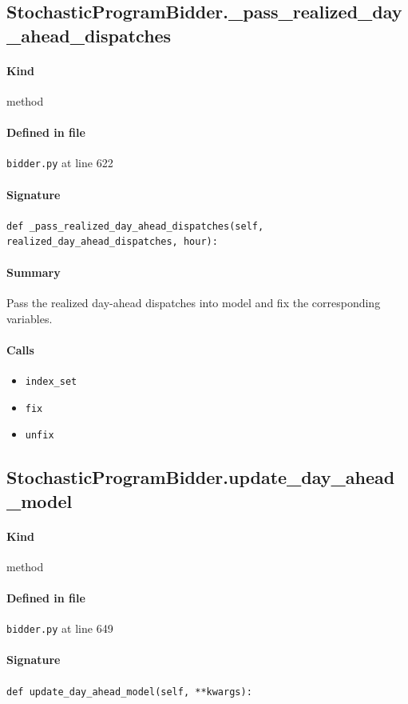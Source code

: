 \documentclass[11pt]{report}
\begin{document}
\subsection{StochasticProgramBidder.\_pass\_realized\_day\_ahead\_dispatches}
\label{def:bidder.py:StochasticProgramBidder._pass_realized_day_ahead_dispatches:L622}
\paragraph{Kind} method
\paragraph{Defined in file} \texttt{bidder.py} at line 622
\paragraph{Signature} \texttt{def \_pass\_realized\_day\_ahead\_dispatches(self, realized\_day\_ahead\_dispatches, hour):}
\paragraph{Summary} Pass the realized day-ahead dispatches into model and fix the corresponding variables.
\paragraph{Calls}
\begin{itemize}[leftmargin=*]
  \item \texttt{index\_set}
  \item \texttt{fix}
  \item \texttt{unfix}
\end{itemize}
\subsection{StochasticProgramBidder.update\_day\_ahead\_model}
\label{def:bidder.py:StochasticProgramBidder.update_day_ahead_model:L649}
\paragraph{Kind} method
\paragraph{Defined in file} \texttt{bidder.py} at line 649
\paragraph{Signature} \texttt{def update\_day\_ahead\_model(self, **kwargs):}
\end{document}
